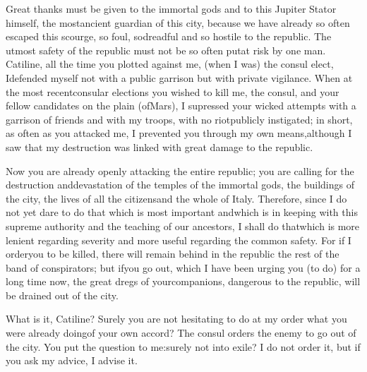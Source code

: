 {  Great thanks must be given to the immortal gods and to this Jupiter Stator himself, the mostancient guardian of this city, because we have already so often escaped this scourge, so foul, sodreadful and so hostile to the republic. The utmost safety of the republic must not be so often putat risk by one man. Catiline, all the time you plotted against me, (when I was) the consul elect, Idefended myself not with a public garrison but with private vigilance. When at the most recentconsular elections you wished to kill me, the consul, and your fellow candidates on the plain (ofMars), I supressed your wicked attempts with a garrison of friends and with my troops, with no riotpublicly instigated; in short, as often as you attacked me, I prevented you through my own means,although I saw that my destruction was linked with great damage to the republic.

  Now you are already openly attacking the entire republic; you are calling for the destruction anddevastation of the temples of the immortal gods, the buildings of the city, the lives of all the citizensand the whole of Italy. Therefore, since I do not yet dare to do that which is most important andwhich is in keeping with this supreme authority and the teaching of our ancestors, I shall do thatwhich is more lenient regarding severity and more useful regarding the common safety. For if I orderyou to be killed, there will remain behind in the republic the rest of the band of conspirators; but ifyou go out, which I have been urging you (to do) for a long time now, the great dregs of yourcompanions, dangerous to the republic, will be drained out of the city.

  What is it, Catiline? Surely you are not hesitating to do at my order what you were already doingof your own accord? The consul orders the enemy to go out of the city. You put the question to me:surely not into exile? I do not order it, but if you ask my advice, I advise it.
}
